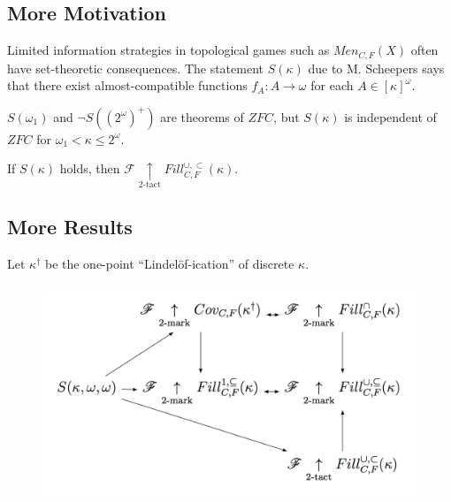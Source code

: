 \documentclass{beamer}
\theoremstyle{definition}
\newcommand{\ktactwin}[1]{\underset{#1\text{-tact}}{\uparrow}}
\newcommand{\oneptlind}[1]{#1^\dagger}
\newcommand{\menGame}[1]{Men_{C,F}\left({#1}\right)}
\newcommand{\cloFillStrictGame}[1]{Fill^{\cup,\subset}_{C,F}\left({#1}\right)}
\newcommand{\<}{\langle}
\renewcommand{\>}{\rangle}
\newcommand{\alcompS}[1]{S(#1)}
\newcommand{\pl}[1]{\mathscr{#1}}
\begin{document}
\subsection{More Motivation}

\begin{frame}
  Limited information strategies in topological games such as
  $\menGame{X}$ often have set-theoretic
  consequences. The statement $\alcompS\kappa$ due to M. Scheepers
  \cite{MR1129143} says that there exist
  almost-compatible functions $f_A:A\to\omega$ for each $A\in[\kappa]^\omega$.

  \begin{theorem}
    $\alcompS{\omega_1}$ and $\neg\alcompS{(2^\omega)^+}$ are theorems
    of $ZFC$, but $\alcompS\kappa$ is independent of $ZFC$ for
    $\omega_1<\kappa\leq 2^\omega$.
  \end{theorem}

  \begin{theorem}
    If $\alcompS{\kappa}$ holds, then
    $\pl F\ktactwin2 \cloFillStrictGame{\kappa}$.
  \end{theorem}
\end{frame}

\subsection{More Results}

\begin{frame}
  Let $\oneptlind\kappa$ be the one-point ``Lindel\"of-ication'' of
  discrete $\kappa$.

  \begin{theorem}
    \begin{figure}
      \includegraphics[width=0.6\linewidth]{mengerGameChart.png}
    \end{figure}
  \end{theorem}
\end{frame}
\end{document}
